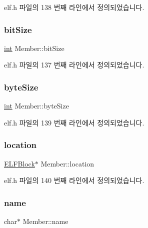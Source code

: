 elf.\+h 파일의 138 번째 라인에서 정의되었습니다.

\mbox{\label{struct_member_a8bf551a2d4b44b5f83737444c90e15aa}} 
\subsubsection{\texorpdfstring{bit\+Size}{bitSize}}
{\footnotesize\ttfamily \mbox{\hyperlink{_util_8cpp_a0ef32aa8672df19503a49fab2d0c8071}{int}} Member\+::bit\+Size}



elf.\+h 파일의 137 번째 라인에서 정의되었습니다.

\mbox{\label{struct_member_a4c713b726b98ec770e1139b672899ef4}} 
\subsubsection{\texorpdfstring{byte\+Size}{byteSize}}
{\footnotesize\ttfamily \mbox{\hyperlink{_util_8cpp_a0ef32aa8672df19503a49fab2d0c8071}{int}} Member\+::byte\+Size}



elf.\+h 파일의 139 번째 라인에서 정의되었습니다.

\mbox{\label{struct_member_adceaf807e8862e3464a63dacfd1d7fb3}} 
\subsubsection{\texorpdfstring{location}{location}}
{\footnotesize\ttfamily \mbox{\hyperlink{struct_e_l_f_block}{E\+L\+F\+Block}}$\ast$ Member\+::location}



elf.\+h 파일의 140 번째 라인에서 정의되었습니다.

\mbox{\label{struct_member_ac8be1720085e46e70c678c5885837ccb}} 
\subsubsection{\texorpdfstring{name}{name}}
{\footnotesize\ttfamily char$\ast$ Member\+::name}



